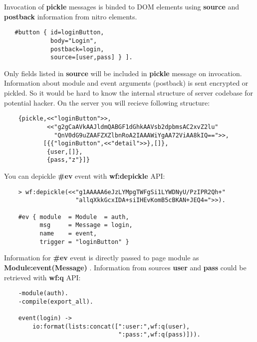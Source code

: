 Invocation of {\bf pickle} messages is binded to DOM elements
using {\bf source} and {\bf postback} information from nitro elements.

\vspace{1\baselineskip}
\begin{lstlisting}
   #button { id=loginButton,
             body="Login",
             postback=login,
             source=[user,pass] } ].
\end{lstlisting}
\vspace{1\baselineskip}

Only fields listed in {\bf source} will be included in {\bf pickle}
message on invocation. Information about module and event arguments (postback)
is sent encrypted or pickled. So it would be hard to know the internal
structure of server codebase for potential hacker. On the server you will
recieve following structure:

\vspace{1\baselineskip}
\begin{lstlisting}
    {pickle,<<"loginButton">>,
            <<"g2gCaAVkAAJldmQABGF1dGhkAAVsb2dpbmsAC2xvZ2lu"
              "QnV0dG9uZAAFZXZlbnRoA2IAAAWiYgAA72ViAA8kIQ==">>,
           [{{"loginButton",<<"detail">>},[]},
            {user,[]},
            {pass,"z"}]}
\end{lstlisting}
\vspace{1\baselineskip}

You can depickle {\bf \#ev} event with {\bf wf:depickle} API:

\vspace{1\baselineskip}
\begin{lstlisting}
    > wf:depickle(<<"g1AAAAA6eJzLYMpgTWFgSi1LYWDNyU/PzIPR2Qh+"
                    "allqXkkGcxIDA+siIHEvKomB5cBKAN+JEQ4=">>).

    #ev { module  = Module  = auth,
          msg     = Message = login,
          name    = event,
          trigger = "loginButton" }
\end{lstlisting}
\vspace{1\baselineskip}

Information for {\bf \#ev} event is directly passed to page module
as {\bf Module:event(Message) }. Information from sources {\bf user}
and {\bf pass} could be retrieved with {\bf wf:q} API:

\vspace{1\baselineskip}
\begin{lstlisting}
    -module(auth).
    -compile(export_all).

    event(login) ->
        io:format(lists:concat([":user:",wf:q(user),
                                ":pass:",wf:q(pass)])).
\end{lstlisting}
\vspace{1\baselineskip}


